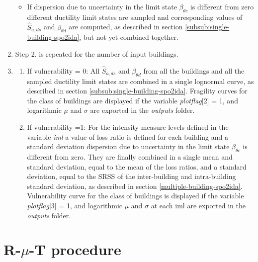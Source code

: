 \begin{enumerate}
\begin{itemize}
\item If dispersion due to uncertainty in the limit state $\beta_{\theta c}$ is different from zero different ductility limit states are sampled and corresponding values of $\hat{S}_{a,ds}$ and $\beta_{\theta d}$ are computed, as described in section \ref{subsub:single-building-spo2ida}, but not yet combined together.
\end{itemize}

\item Step 2. is repeated for the number of input buildings.

\item
\begin{enumerate}
\item If vulnerability = 0: All $\hat{S}_{a,ds}$ and $\beta_{\theta d}$ from all the buildings and all the sampled ductility limit states are combined in a single lognormal curve, as described in section \ref{subsub:single-building-spo2ida}. Fragility curves for the class of buildings are displayed if the variable \textit{plotflag}[2] = 1, and logarithmic $\mu$ and $\sigma$ are exported in the \textit{outputs} folder.
\item If vulnerability =1:  For the intensity measure levels defined in the variable \textit{iml} a value of loss ratio is defined for each building and a standard deviation dispersion due to uncertainty in the limit state $\beta_{\theta c}$ is different from zero. They are finally combined in a single mean and standard deviation, equal to the mean of the loss ratios, and a standard deviation, equal to the SRSS of the inter-building and intra-building standard deviation, as described in section \ref{multiple-building-spo2ida}. Vulnerability curve for the class of buildings is displayed if the variable \textit{plotflag}[3] = 1, and logarithmic $\mu$ and $\sigma$ at each iml are exported in the \textit{outputs} folder.
\end{enumerate}

\end{enumerate}

\section{R-$\mu$-T procedure}
\label{sec:DF}
